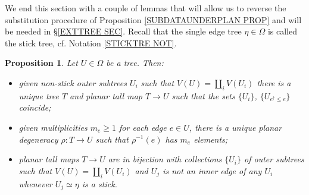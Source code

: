 \documentclass[a4paper,10pt
,draft
]{article}%
\numberwithin{equation}{section}
\numberwithin{figure}{section}
\newtheorem{proposition}[equation]{Proposition}%
\theoremstyle{definition} %
\newcommand{\1}{\ensuremath{\mathbbm 1}}%
\begin{document}
We end this section with a couple of lemmas that will allow us to reverse the substitution procedure of 
Proposition \ref{SUBDATAUNDERPLAN PROP}
and will be needed in \S \ref{EXTTREE SEC}.
Recall that the single edge tree $\eta \in \Omega$ is called the stick tree,
cf. Notation \ref{STICKTRE NOT}.

\begin{proposition}\label{BUILDABLE PROP}
	Let $U \in \Omega$ be a tree. Then:
\begin{itemize}
	\item[(i)] given non-stick outer subtrees $U_i$ such that 
	$V(U) = \coprod_i V(U_i)$ there is a unique tree $T$ and planar tall map $T \to U$ such that the sets $\{U_i\}$, $\{U_{e^{\uparrow}\leq e}\}$ coincide;
	\item[(ii)] given multiplicities $m_e \geq 1$ for each edge $e \in U$, there is a unique planar degeneracy $\rho \colon T \to U$ such that $\rho^{-1}(e)$ has $m_e$ elements;
	\item[(iii)] planar tall maps $T \to U$ are in bijection with collections $\{U_i\}$ of outer subtrees such that $V(U) = \coprod_i V(U_i)$ and $U_j$ is not an inner edge of any $U_i$ whenever $U_j \simeq \eta$ is a stick.
\end{itemize}
\end{proposition}
\end{document}
